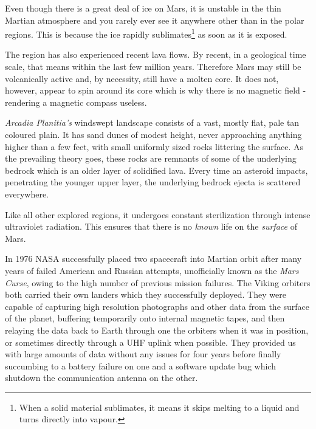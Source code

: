 Even though there is a great deal of ice on Mars, it is unstable in the thin Martian atmosphere and you rarely ever see it anywhere other than in the polar regions. This is because the ice rapidly sublimates\footnote{When a solid material sublimates, it means it skips melting to a liquid and turns directly into vapour.} as soon as it is exposed.

The region has also experienced recent lava flows. By recent, in a geological time scale, that means within the last few million years. Therefore Mars may still be volcanically active and, by necessity, still have a molten core. It does not, however, appear to spin around its core which is why there is no magnetic field - rendering a magnetic compass useless.

    {}
    {}
    {}
    \stopcombination

{\it Arcadia Planitia's} windswept landscape consists of a vast, mostly flat, pale tan coloured plain. It has sand dunes of modest height, never approaching anything higher than a few feet, with small uniformly sized rocks littering the surface. As the prevailing theory goes, these rocks are remnants of some of the underlying bedrock which is an older layer of solidified lava. Every time an asteroid impacts, penetrating the younger upper layer, the underlying bedrock ejecta is scattered everywhere.

Like all other explored regions, it undergoes constant sterilization through intense ultraviolet radiation. This ensures that there is no {\it known} life on the {\it surface} of Mars.


In 1976 NASA successfully placed two spacecraft into Martian orbit after many years of failed American and Russian attempts, unofficially known as the {\it Mars Curse}, owing to the high number of previous mission failures. The Viking orbiters both carried their own landers which they successfully deployed. They were capable of capturing high resolution photographs and other data from the surface of the planet, buffering temporarily onto internal magnetic tapes, and then relaying the data back to Earth through one the orbiters when it was in position, or sometimes directly through a UHF uplink when possible. They provided us with large amounts of data without any issues for four years before finally succumbing to a battery failure on one and a software update bug which shutdown the communication antenna on the other.

